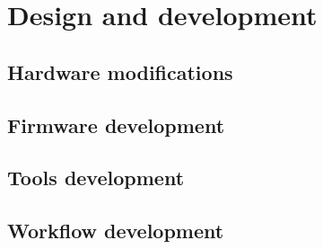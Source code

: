 \chapter{Design and development}
\label{chap:development}

\section{Hardware modifications}
\label{sec:dev-hardware}

\section{Firmware development}
\label{sec:dev-firmware}

\section{Tools development}
\label{sec:dev-tools}

\section{Workflow development}
\label{sec:dev-workflow}

